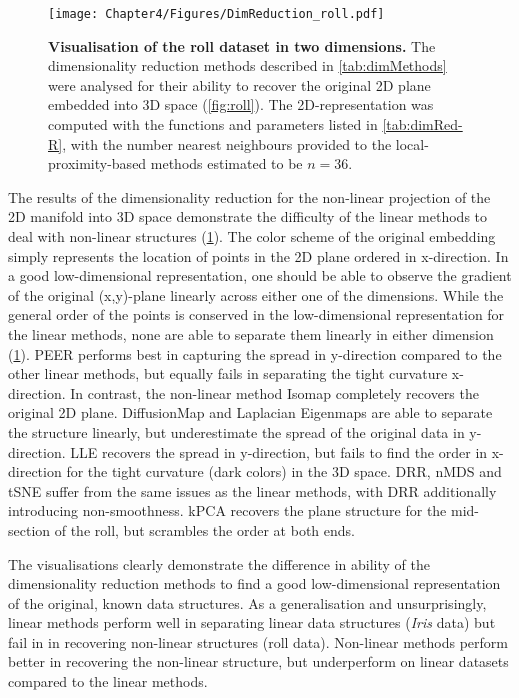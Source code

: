 \begin{figure}[hbtp]
	\centering
	\texttt{[image: Chapter4/Figures/DimReduction\_roll.pdf]}
	\caption[\textbf{Visualisation of the roll dataset in two dimensions.}]{\textbf{Visualisation of the roll dataset in two dimensions.} The dimensionality reduction methods described in \cref{tab:dimMethods} were analysed for their ability to recover the original 2D plane embedded into 3D space (\cref{fig:roll}). The 2D-representation was computed with the functions and parameters listed in \cref{tab:dimRed-R}, with the number nearest neighbours provided to the local-proximity-based methods estimated to be \(n=36\). } 
	 	\label{fig:dimRed-roll}
\end{figure}


The results of the dimensionality reduction for the non-linear projection of the 2D manifold into 3D space demonstrate the difficulty of the linear methods to deal with non-linear structures (\cref{fig:dimRed-roll}). The color scheme of the original embedding simply represents the location of points in the 2D plane ordered in x-direction. In a good low-dimensional representation, one should be able to observe the gradient of the original (x,y)-plane linearly across either one of the dimensions. While the general order of the points is conserved in the low-dimensional representation for the linear methods, none are able to separate them linearly in either dimension (\cref{fig:dimRed-roll}). PEER performs best in capturing the spread in y-direction compared to the other linear methods, but equally fails in separating the tight curvature x-direction. In contrast, the non-linear method Isomap completely recovers the original 2D plane. DiffusionMap and Laplacian Eigenmaps are able to separate the structure linearly, but underestimate the spread of the original data in y-direction. LLE recovers the spread in y-direction, but fails to find the order in x-direction for the tight curvature (dark colors) in the 3D space. DRR, nMDS and tSNE suffer from the same issues as the linear methods, with DRR additionally introducing non-smoothness. kPCA recovers the plane structure for the mid-section of the roll, but scrambles the order at both ends. 

The visualisations clearly demonstrate the difference in ability of the dimensionality reduction methods to find a good low-dimensional representation of the original, known data structures. As a generalisation and unsurprisingly, linear methods perform well in separating linear data structures (\textit{Iris} data) but fail in in recovering non-linear structures (roll data). Non-linear methods perform better in recovering the non-linear structure, but underperform on linear datasets compared to the linear methods. 

